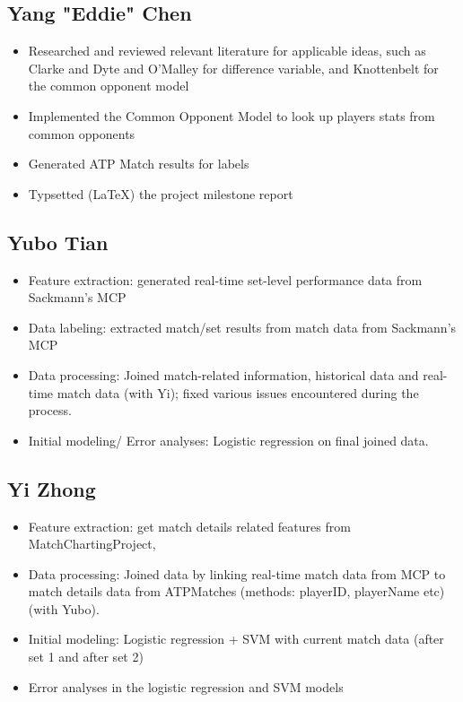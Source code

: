 \documentclass[paper=a4, fontsize=11pt]{scrartcl} %
\numberwithin{equation}{section} %
\numberwithin{figure}{section} %
\numberwithin{table}{section} %
\begin{document}
\subsection{Yang "Eddie" Chen}
\begin{itemize}
\item Researched and reviewed relevant literature for applicable ideas, such as Clarke and Dyte \cite{Clarke2010} and O'Malley \cite{omalley} for difference variable, and Knottenbelt \cite{KNOTTENBELT20123820} for the common opponent model
\item Implemented the Common Opponent Model to look up players stats from common opponents
\item Generated ATP Match results for labels
\item Typsetted (\LaTeX) the project milestone report
\end{itemize}

\subsection{Yubo Tian}
\begin{itemize}
\item Feature extraction:  generated real-time set-level performance data from Sackmann's MCP
\cite{tennis_charting}
\item Data labeling: extracted match/set results from match data from Sackmann's MCP 
\cite{tennis_charting}
\item Data processing: Joined match-related information, historical data and real-time match data (with Yi); fixed various issues encountered during the process.
\item Initial modeling/ Error analyses: Logistic regression on final joined data.
\end{itemize}

\subsection{Yi Zhong}
\begin{itemize}
\item Feature extraction: get match details related features from MatchChartingProject, 
\item Data processing: Joined data by linking real-time match data from MCP \cite{tennis_charting} to match details data from ATPMatches \cite{tennis_atp} (methods: playerID, playerName etc) (with Yubo).
\item Initial modeling: Logistic regression + SVM with current match data (after set 1 and after set 2)
\item Error analyses in the logistic regression and SVM models
\end{itemize}
\end{document}
